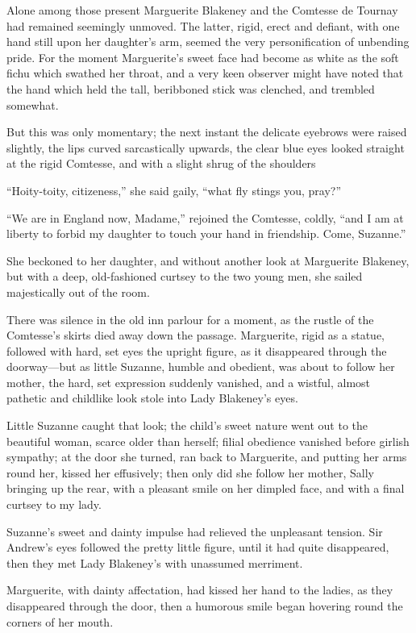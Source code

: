 Alone among those present Marguerite Blakeney and the Comt\-esse de Tournay had remained seemingly unmoved. The latter, rigid, erect and defiant, with one hand still upon her daughter's arm, seemed the very personification of unbending pride. For the moment Marguerite's sweet face had become as white as the soft fichu which swathed her throat, and a very keen observer might have noted that the hand which held the tall, beribboned stick was clenched, and trembled somewhat.

But this was only momentary; the next instant the delicate eyebrows were raised slightly, the lips curved sarcastically upwards, the clear blue eyes looked straight at the rigid Comtesse, and with a slight shrug of the shoulders\longdash


\enquote{Hoity-toity, citizeness,} she said gaily, \enquote{what fly stings you, pray?}

\enquote{We are in England now, Madame,} rejoined the Comtesse, coldly, \enquote{and I am at liberty to forbid my daughter to touch your hand in friendship. Come, Suzanne.}

She beckoned to her daughter, and without another look at Marguerite Blakeney, but with a deep, old-fashioned curtsey to the two young men, she sailed majestically out of the room.

There was silence in the old inn parlour for a moment, as the rustle of the Comtesse's skirts died away down the passage. Marguerite, rigid as a statue, followed with hard, set eyes the upright figure, as it disappeared through the doorway---but as little Suzanne, humble and obedient, was about to follow her mother, the hard, set expression suddenly vanished, and a wistful, almost pathetic and childlike look stole into Lady Blakeney's eyes.

Little Suzanne caught that look; the child's sweet nature went out to the beautiful woman, scarce older than herself; filial obedience vanished before girlish sympathy; at the door she turned, ran back to Marguerite, and putting her arms round her, kissed her effusively; then only did she follow her mother, Sally bringing up the rear, with a pleasant smile on her dimpled face, and with a final curtsey to my lady.

Suzanne's sweet and dainty impulse had relieved the unpleasant tension. Sir Andrew's eyes followed the pretty little figure, until it had quite disappeared, then they met Lady Blakeney's with unassumed merriment.

Marguerite, with dainty affectation, had kissed her hand to the ladies, as they disappeared through the door, then a humorous smile began hovering round the corners of her mouth.

